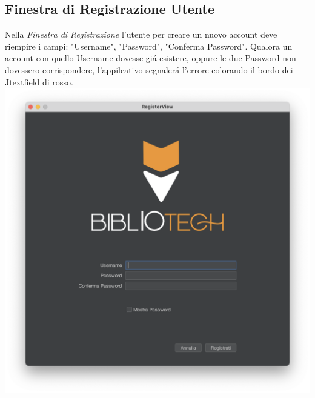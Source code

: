  \subsection{Finestra di Registrazione Utente}
 Nella \textit{Finestra di Registrazione} l'utente per creare un nuovo account deve riempire i campi: "Username", 
 "Password", "Conferma Password".
 Qualora un account con quello Username dovesse gi\'a esistere, oppure le due Password non dovessero corrispondere, 
 l'appilcativo segnaler\'a l'errore colorando il bordo dei Jtextfield di rosso.
 \\
 \includegraphics[scale=0.25, center]{Immagini/Schermate/Login_Register/RegisterPage.png}

